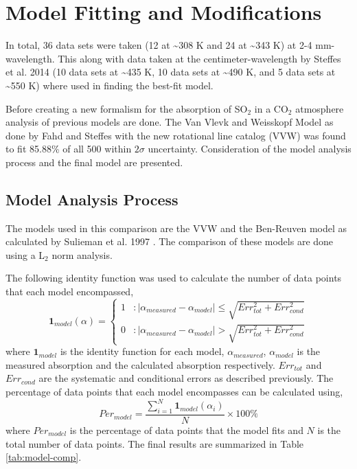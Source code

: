 \chapter{Model Fitting and Modifications}
In total, 36 data sets were taken (12 at \textasciitilde 308 K and 24 at \textasciitilde 343 K) at 2-4 mm-wavelength. This along with data taken at the centimeter-wavelength by Steffes et al. 2014 \cite{Steffes-2014}(10 data sets at \textasciitilde 435 K, 10 data sets at \textasciitilde 490 K, and 5 data sets at \textasciitilde 550 K) where used in finding the best-fit model.

Before creating a new formalism for the absorption of SO$_2$ in a CO$_2$ atmosphere analysis of previous models are done. The Van Vlevk and Weisskopf Model as done by Fahd and Steffes \cite{Fahd-thesis} with the new rotational line catalog (VVW) was found to fit 85.88\% of all 500 within $2\sigma$ uncertainty. Consideration of the model analysis process and the final model are presented.


\section{Model Analysis Process}

The models used in this comparison are the VVW and the Ben-Reuven model as calculated by Sulieman et al. 1997 \cite{Sulieman-thesis}. The comparison of these models are done using a L$_2$ norm analysis. 

The following identity function was used to calculate the number of data points that each model encompassed,
\begin{equation}
\textbf{1}_{model}(\alpha) = \left\{
     \begin{array}{lr}
       1 & : |\alpha_{measured} - \alpha_{model}| \leq \sqrt{Err_{tot}^2 + Err_{cond}^2 }\\
       0 & : |\alpha_{measured} - \alpha_{model}| > \sqrt{Err_{tot}^2 + Err_{cond}^2 }
     \end{array}
   \right.
\end{equation}
where $\textbf{1}_{model}$ is the identity function for each model, $\alpha_{measured}$, $\alpha_{model}$ is the measured absorption and the calculated absorption respectively. $Err_{tot}$ and $Err_{cond}$ are the systematic and conditional errors as described previously. The percentage of data points that each model encompasses can be calculated using,
\begin{equation}
Per_{model} = \frac{\sum_{i=1}^N \textbf{1}_{model}(\alpha_i)}{N}\times 100\%
\end{equation}
where $Per_{model}$ is the percentage of data points that the model fits and $N$ is the total number of data points. The final results are summarized in Table \ref{tab:model-comp}.

